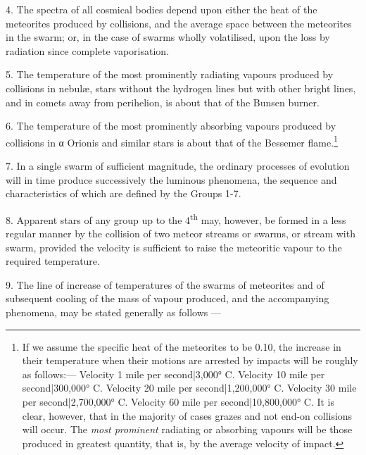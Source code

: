 \documentclass[a4paper, 12pt, oneside, polutonikogreek, english]{article}
\begin{document}
4. The spectra of all cosmical bodies depend upon either the heat of the meteorites produced by collisions, and the average space between the meteorites in the swarm; or, in the case of swarms wholly volatilised, upon the loss by radiation since complete vaporisation.

5. The temperature of the most prominently radiating vapours produced by collisions in nebulæ, stars without the hydrogen lines but with other bright lines, and in comets away from perihelion, is about that of the Bunsen burner.

6. The temperature of the most prominently absorbing vapours produced by collisions in α Orionis and similar stars is about that of the Bessemer flame.\footnote{If we assume the specific heat of the meteorites to be 0.10, the increase in their temperature when their motions are arrested by impacts will be roughly as follows:--- Velocity 1 mile per second|3,000° C. Velocity 10 mile per second|300,000° C. Velocity 20 mile per second|1,200,000° C. Velocity 30 mile per second|2,700,000° C. Velocity 60 mile per second|10,800,000° C. It is clear, however, that in the majority of cases grazes and not end-on collisions will occur. The \emph{most prominent} radiating or absorbing vapours will be those produced in greatest quantity, that is, by the average velocity of impact.}

7. In a single swarm of sufficient magnitude, the ordinary processes of evolution will in time produce successively the luminous phenomena, the sequence and characteristics of which are defined by the Groups 1-7.

8. Apparent stars of any group up to the 4\textsuperscript{th} may, however, be formed in a less regular manner by the collision of two meteor streams or swarms, or stream with swarm, provided the velocity is sufficient to raise the meteoritic vapour to the required temperature.

9. The line of increase of temperatures of the swarms of meteorites and of subsequent cooling of the mass of vapour produced, and the accompanying phenomena, may be stated generally as follows ---
\end{document}
